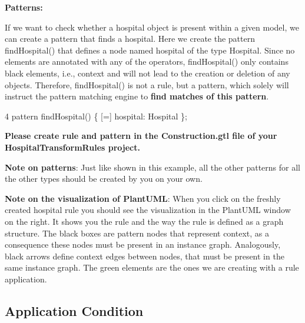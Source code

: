 \textbf{Patterns:}

If we want to check whether a hospital object is present within a given model, we can create a pattern that finds a hospital. Here we create the pattern \textsf{findHospital()} that defines a node named hospital of the type Hospital. Since no elements are annotated with any of the operators, findHospital() only contains black elements, i.e., context and will not lead to the creation or deletion of any objects.\newline
Therefore, findHospital() is not a rule, but a pattern, which solely will instruct the pattern matching engine to \textbf{find matches of this pattern}.\newline

{

4 \hspace{0.5cm}	{\color{Purple}pattern} findHospital() \{ \hspace{1cm}	{[=]} hospital: Hospital \hspace{0.5cm}	\};\newline

}

\textbf{Please create rule and pattern in the \textsf{Construction.gtl} file of your \textsf{HospitalTransformRules} project.}\newline

\textbf{Note on patterns}:
\newline
Just like shown in this example, all the other patterns for all the other types should be created by you on your own.\newline

\textbf{Note on the visualization of PlantUML}:
\newline
When you click on the freshly created hospital rule you should see the visualization in the PlantUML window on the right. It shows you the rule and the way the rule is defined as a graph structure. The black boxes are pattern nodes that represent context, as a consequence these nodes must be present in an instance graph. Analogously, black arrows define context edges between nodes, that must be present in the same instance graph. The green elements are the ones we are creating with a rule application.

\clearpage

\subsection{Application Condition}

